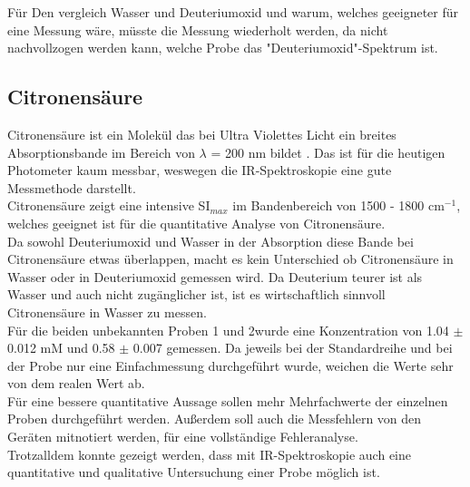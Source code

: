 \documentclass[10pt,a4paper]{article}
\begin{document}
			Für Den vergleich Wasser und Deuteriumoxid und warum, welches geeigneter für eine Messung wäre, müsste die Messung wiederholt werden, da nicht nachvollzogen werden kann, welche Probe das "Deuteriumoxid"-Spektrum ist.
			
			\subsection{Citronensäure}
				Citronensäure ist ein Molekül das bei Ultra Violettes Licht ein breites Absorptionsbande im Bereich von $\lambda$ = 200 nm bildet \cite{Citricacid_UV}. Das ist für die heutigen Photometer kaum messbar, weswegen die IR-Spektroskopie eine gute Messmethode darstellt.\\
				Citronensäure zeigt eine intensive SI$_{max}$ im Bandenbereich von 1500 - 1800 cm$^{-1}$, welches geeignet ist für die quantitative Analyse von Citronensäure.\\
				Da sowohl Deuteriumoxid und Wasser in der Absorption diese Bande bei Citronensäure etwas überlappen, macht es kein Unterschied ob Citronensäure in Wasser oder in Deuteriumoxid gemessen wird. Da Deuterium teurer ist als Wasser und auch nicht zugänglicher ist, ist es wirtschaftlich sinnvoll Citronensäure in Wasser zu messen.\\
				Für die beiden unbekannten Proben 1 und 2wurde eine Konzentration von 1.04 $\pm$ 0.012 mM und 0.58 $\pm$ 0.007 gemessen.
				Da jeweils bei der Standardreihe und bei der Probe nur eine Einfachmessung durchgeführt wurde, weichen die Werte sehr von dem realen Wert ab.\\
				Für eine bessere quantitative Aussage sollen mehr Mehrfachwerte der einzelnen Proben durchgeführt werden. Außerdem soll auch die Messfehlern von den Geräten mitnotiert werden, für eine vollständige Fehleranalyse.\\
				Trotzalldem konnte gezeigt werden, dass mit IR-Spektroskopie auch eine quantitative und qualitative Untersuchung einer Probe möglich ist.
			
			
\end{document}
